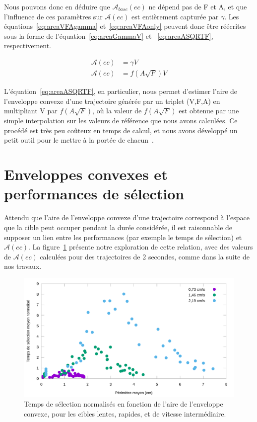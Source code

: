 	Nous pouvons donc en déduire que $\mathcal{A}_{base}(ec)$ ne dépend pas de F et A, et que l'influence de ces paramètres sur $\mathcal{A}(ec)$ est entièrement capturée par $\gamma$. Les équations~\ref{eq:areaVFAgamma} et~\ref{eq:areaVFAonly} peuvent donc être réécrites sous la forme de l'équation~\ref{eq:areaGammaV} et ~\ref{eq:areaASQRTF}, respectivement.
	
	\begin{align}
		\label{eq:areaGammaV}
		\mathcal{A}(ec) &= \gamma{}V \\
		\label{eq:areaASQRTF}
		\mathcal{A}(ec) &= f\left(A\sqrt{F}\right)V
	\end{align}
	
	L'équation~\ref{eq:areaASQRTF}, en particulier, nous permet d'estimer l'aire de l'enveloppe convexe d'une trajectoire générée par un triplet (V,F,A) en multipliant V par $f\left(A\sqrt{F}\right)$, où la valeur de $f\left(A\sqrt{F}\right)$ est obtenue par une simple interpolation sur les valeurs de référence que nous avons calculées. Ce procédé est très peu coûteux en temps de calcul, et nous avons développé un petit outil pour le mettre à la portée de chacun~\cite{myNiftyLittleToolThatIHaventActuallyDevelopedYetButShhhDontTellAnyone}.
	
\section{Enveloppes convexes et performances de sélection}
	Attendu que l'aire de l'enveloppe convexe d'une trajectoire correspond à l'espace que la cible peut occuper pendant la durée considérée, il est raisonnable de supposer un lien entre les performances (par exemple le temps de sélection) et $\mathcal{A}(ec)$. La figure~\ref{fig:perfVareaRaw} présente notre exploration de cette relation, avec des valeurs de $\mathcal{A}(ec)$ calculées pour des trajectoires de 2 secondes, comme dans la suite de nos travaux.

	\begin{figure}[!htb]
		\centering
		\includegraphics[width=\textwidth]{figures/ch4/perfVareaRaw}
		\caption[Temps de sélection en fonction de l'aire de l'enveloppe convexe]{Temps de sélection normalisés en fonction de l'aire de l'enveloppe convexe, pour les cibles lentes, rapides, et de vitesse intermédiaire.}
		\label{fig:perfVareaRaw}
	\end{figure}

